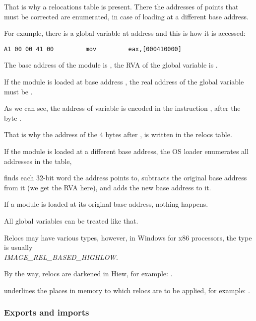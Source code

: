 That is why a relocations table is present.
There the addresses of points that must be corrected are enumerated,
in case of loading at a different base address.

For example, there is a global variable at address  and this is how it is accessed:

\begin{lstlisting}[style=customasmx86]
A1 00 00 41 00         mov         eax,[000410000]
\end{lstlisting}

The base address of the module is , the \ac{RVA} of the global variable is .

If the module is loaded at base address , the real address of the global variable must be .


As we can see, the address of variable is encoded in the instruction , after the byte .

That is why the address of the 4 bytes after , is written in the relocs table.

If the module is loaded at a different base address, the \ac{OS} loader enumerates all addresses in the table,

finds each 32-bit word the address points to, subtracts the original base address from it
(we get the \ac{RVA} here), and adds the new base address to it.

If a module is loaded at its original base address, nothing happens.

All global variables can be treated like that.

Relocs may have various types, however, in Windows for x86 processors, the type is usually \\
\emph{IMAGE\_REL\_BASED\_HIGHLOW}.


By the way, relocs are darkened in Hiew, for example: .

\myindex{\olly}
\olly underlines the places in memory to which relocs are to be applied, for example: .

\subsubsection{Exports and imports}

